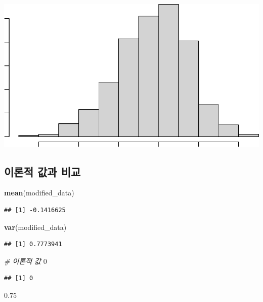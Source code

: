 \documentclass[
]{article}
\newenvironment{Shaded}{\begin{snugshade}}{\end{snugshade}}
\newcommand{\CommentTok}[1]{\textcolor[rgb]{0.56,0.35,0.01}{\textit{#1}}}
\newcommand{\DecValTok}[1]{\textcolor[rgb]{0.00,0.00,0.81}{#1}}
\newcommand{\FloatTok}[1]{\textcolor[rgb]{0.00,0.00,0.81}{#1}}
\newcommand{\FunctionTok}[1]{\textcolor[rgb]{0.13,0.29,0.53}{\textbf{#1}}}
\newcommand{\NormalTok}[1]{#1}
\begin{document}
\begin{center}\includegraphics[width=0.8\linewidth]{Timeseries_Analysis_HW3_files/figure-latex/unnamed-chunk-3-1} \end{center}

\subsection{이론적 값과
비교}\label{uxc774uxb860uxc801-uxac12uxacfc-uxbe44uxad50}

\begin{Shaded}
\begin{Highlighting}[]
\FunctionTok{mean}\NormalTok{(modified\_data)}
\end{Highlighting}
\end{Shaded}

\begin{verbatim}
## [1] -0.1416625
\end{verbatim}

\begin{Shaded}
\begin{Highlighting}[]
\FunctionTok{var}\NormalTok{(modified\_data)}
\end{Highlighting}
\end{Shaded}

\begin{verbatim}
## [1] 0.7773941
\end{verbatim}

\begin{Shaded}
\begin{Highlighting}[]
\CommentTok{\# 이론적 값}
\DecValTok{0}
\end{Highlighting}
\end{Shaded}

\begin{verbatim}
## [1] 0
\end{verbatim}

\begin{Shaded}
\begin{Highlighting}[]
\FloatTok{0.75}
\end{Highlighting}
\end{Shaded}
\end{document}

